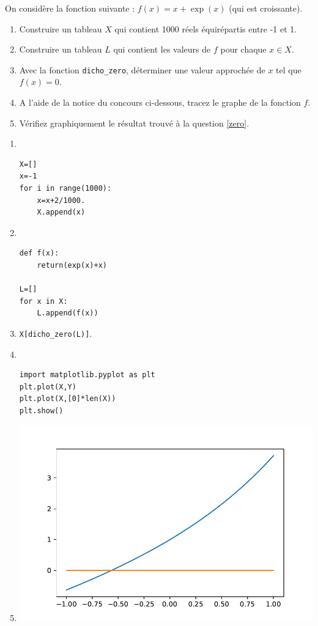 \begin{exercice}
On considère la fonction suivante : $f(x)=x+\exp(x)$ (qui est croissante).
\begin{enumerate}
\item Construire un tableau $X$ qui contient 1000 réels équirépartis entre -1 et 1.
\item Construire un tableau $L$ qui contient les valeurs de $f$ pour chaque $x\in X$.
\item \label{zero} Avec la fonction \verb?dicho_zero?, déterminer une valeur approchée de $x$ tel que $f(x)=0$.
\item A l'aide de la notice du concours ci-dessous, tracez le graphe de la fonction $f$.
\item Vérifiez graphiquement le résultat trouvé à la question \ref{zero}.
\end{enumerate}
\end{exercice}

\begin{solution}
\begin{enumerate}
\item ~\\ 
\vspace{-0.7cm}
\begin{verbatim}
X=[]
x=-1
for i in range(1000):
    x=x+2/1000.
    X.append(x)
\end{verbatim}    
\item ~\\ 
\vspace{-0.7cm}
\begin{verbatim}
def f(x):
    return(exp(x)+x)

L=[]
for x in X:
    L.append(f(x)) 
\end{verbatim}    
\item \verb?X[dicho_zero(L)]?.
\item ~\\ 
\vspace{-0.7cm}
\begin{verbatim}
import matplotlib.pyplot as plt    
plt.plot(X,Y)  
plt.plot(X,[0]*len(X)) 
plt.show() 
\end{verbatim}   
\item \includegraphics[scale=1]{graphe_f.pdf}
\end{enumerate}
\end{solution}

